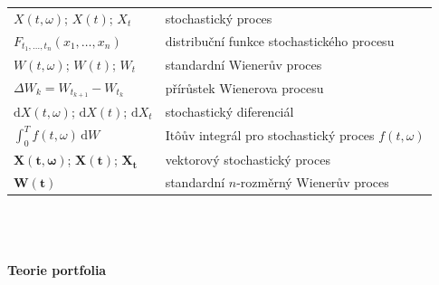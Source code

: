\documentclass[a4paper,12pt]{report}
\theoremstyle{definition} \newtheorem{definice}[veta]{Definice}
\theoremstyle{remark}
\begin{document}
   \begin{tabular}{p{4cm} p{9.3cm}}
     $X(t,\omega)$; $X(t)$; $X_t$                       &   stochastický proces \\
   $F_{t_1,\dots,t_n}(x_1,\dots,x_n)$                       &  distribuční funkce stochastického procesu \\
   $W(t,\omega)$; $W(t)$; $W_t$                       &   standardní Wienerův proces \\
   $\Delta W_k=W_{t_{k+1}}-W_{t_k}$				 &   přírůstek Wienerova procesu \\
   $\mathrm{d}X(t,\omega)$; $\mathrm{d}X(t)$; $\mathrm{d}X_t$    &  stochastický diferenciál \\ %
   $\int_0^Tf(t,\omega)\,\mathrm{d}W$                              &   It\^oův integrál pro stochastický proces $f(t,\omega)$ \\
   $\boldsymbol{X}(\boldsymbol{t},\boldsymbol{\omega})$; $\boldsymbol{X}(\boldsymbol{t})$; $\boldsymbol{X}_{\boldsymbol{t}}$  		& vektorový stochastický proces\\
   $\boldsymbol{W}(\boldsymbol{t})$ 		& standardní $n$-rozměrný Wienerův proces\\
   \end{tabular}\\\\\\
%
%
\textbf{Teorie portfolia}\\\\
\end{document}
